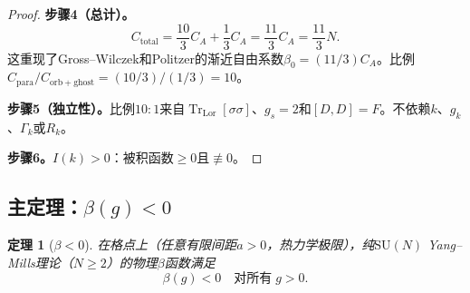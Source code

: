 \documentclass[12pt,a4paper]{article}
\theoremstyle{plain}
\newtheorem{theorem}{定理}[section]
\theoremstyle{definition}
\theoremstyle{remark}
\begin{document}
\begin{proof}
\textbf{步骤4（总计）。}
\begin{equation}\label{eq:Ctotal}
C_{\mathrm{total}} = \frac{10}{3}C_A + \frac{1}{3}C_A = \frac{11}{3}C_A = \frac{11}{3}N.
\end{equation}
这重现了Gross--Wilczek\cite{GrossWilczek1973}和Politzer\cite{Politzer1973}的渐近自由系数$\beta_0=(11/3)C_A$。比例$C_{\mathrm{para}}/C_{\mathrm{orb+ghost}}=(10/3)/(1/3)=10$。

\textbf{步骤5（独立性）。}比例$10{:}1$来自$\operatorname{Tr}_{\mathrm{Lor}}[\sigma\sigma]$、$g_s=2$和$[D,D]=F$。不依赖$k$、$g_k$、$\Gamma_k$或$R_k$。

\textbf{步骤6。}$I(k)>0$：被积函数$\geq 0$且$\not\equiv 0$。
\end{proof}

\subsection{主定理：$\beta(g)<0$}\label{sec:mainbeta}

\begin{theorem}[$\beta<0$]\label{thm:beta}
在格点上（任意有限间距$a>0$，热力学极限），纯$\mathrm{SU}(N)$ Yang--Mills理论（$N\geq 2$）的物理$\beta$函数满足
\begin{equation}\label{eq:betaneg}
\beta(g) < 0 \quad \text{对所有}\;g>0.
\end{equation}
\end{theorem}
\end{document}
